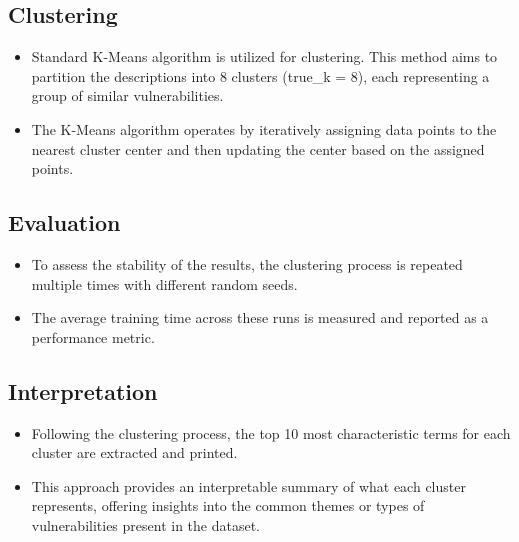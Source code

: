 \documentclass[12pt]{article}
\begin{document}
\subsection{Clustering}

\begin{itemize}

	\item Standard K-Means algorithm is utilized for clustering. This method aims to partition the
	      descriptions into 8 clusters (true\_k = 8), each representing a group of similar
	      vulnerabilities.

	\item The K-Means algorithm operates by iteratively assigning data points to the nearest cluster
	      center and then updating the center based on the assigned points.

\end{itemize}

\subsection{Evaluation}

\begin{itemize}

	\item To assess the stability of the results, the clustering process is repeated multiple times
	      with different random seeds.

	\item The average training time across these runs is measured and reported as a performance
	      metric.

\end{itemize}

\subsection{Interpretation}

\begin{itemize}

	\item Following the clustering process, the top 10 most characteristic terms for each cluster
	      are extracted and printed.

	\item This approach provides an interpretable summary of what each cluster represents, offering
	      insights into the common themes or types of vulnerabilities present in the dataset.

\end{itemize}
\end{document}
